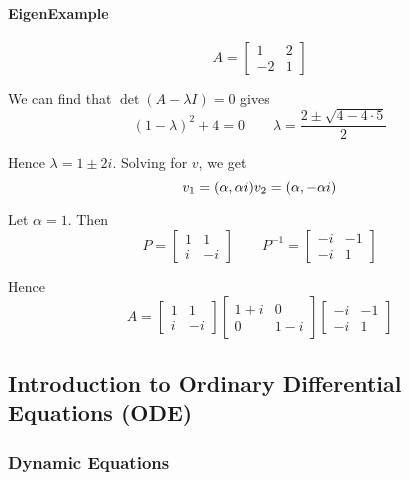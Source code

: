 \documentclass{article}
\begin{document}
\paragraph{EigenExample}
\label{par:eigenexample}

\[
  A = \left[\begin{matrix}
      1 & 2 \\ -2 & 1
  \end{matrix}\right]
\]

We can find that $\det(A - \lambda I) = 0$ gives
\[
  (1 - \lambda)^2 + 4 = 0
  \quad\quad
  \lambda = \dfrac{2 \pm \sqrt{4 - 4 \cdot 5}}{2}
\]

Hence $\lambda = 1 \pm 2i$. Solving for $v$, we get
\[
  v_1 = (\alpha, \alpha i)
  \\
  v_2 = (\alpha, -\alpha i)
\]

Let $\alpha = 1$. Then
\[
  P = \left[\begin{matrix}
    1 & 1 \\ i & -i
  \end{matrix}\right]
  \quad\quad
  P^{-1} = \left[\begin{matrix}
    -i & -1 \\ -i & 1
  \end{matrix}\right]
\]

Hence
\[
  A =
  \left[\begin{matrix}
    1 & 1 \\ i & -i
  \end{matrix}\right]
  \left[\begin{matrix}
    1 + i & 0 \\ 0 & 1 - i
  \end{matrix}\right]
  \left[\begin{matrix}
    -i & -1 \\ -i & 1
  \end{matrix}\right]
\]

\subsection{Introduction to Ordinary Differential Equations (ODE)}
\label{sub:introduction_to_ordinary_differential_equations_ode_}

\subsubsection{Dynamic Equations}
\label{ssub:dynamic_equations}
\end{document}

